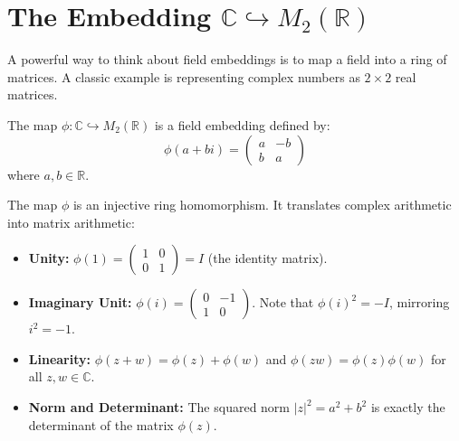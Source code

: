 \section{The Embedding $\mathbb{C} \hookrightarrow M_2(\mathbb{R})$}

A powerful way to think about field embeddings is to map a field into a ring of matrices. A classic example is representing complex numbers as $2 \times 2$ real matrices.

\begin{definition}
The map $\phi: \mathbb{C} \hookrightarrow M_2(\mathbb{R})$ is a field embedding defined by:
\[ \phi(a + bi) = \begin{pmatrix} a & -b \\ b & a \end{pmatrix} \]
where $a, b \in \mathbb{R}$.
\end{definition}

\begin{theorem}
The map $\phi$ is an injective ring homomorphism. It translates complex arithmetic into matrix arithmetic:
\begin{itemize}
    \item \textbf{Unity:} $\phi(1) = \begin{pmatrix} 1 & 0 \\ 0 & 1 \end{pmatrix} = I$ (the identity matrix).
    \item \textbf{Imaginary Unit:} $\phi(i) = \begin{pmatrix} 0 & -1 \\ 1 & 0 \end{pmatrix}$. Note that $\phi(i)^2 = -I$, mirroring $i^2 = -1$.
    \item \textbf{Linearity:} $\phi(z+w) = \phi(z) + \phi(w)$ and $\phi(zw) = \phi(z)\phi(w)$ for all $z, w \in \mathbb{C}$.
    \item \textbf{Norm and Determinant:} The squared norm $|z|^2 = a^2+b^2$ is exactly the determinant of the matrix $\phi(z)$.
\end{itemize}
\end{theorem}


